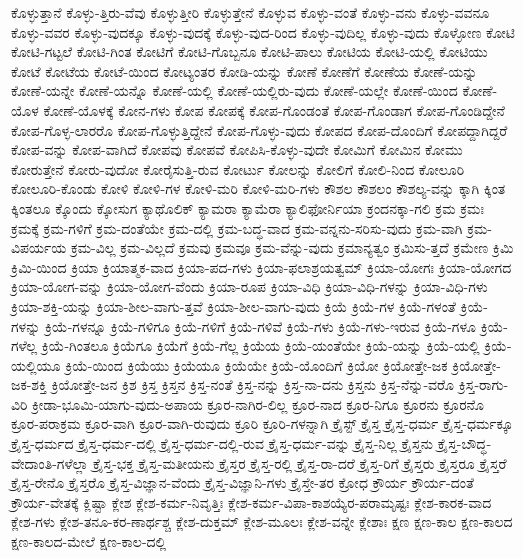{ಕೊಳ್ಳುತ್ತಾನೆ
ಕೊಳ್ಳು-ತ್ತಿರು-ವೆವು
ಕೊಳ್ಳುತ್ತೀರಿ
ಕೊಳ್ಳುತ್ತೇನೆ
ಕೊಳ್ಳುವ
ಕೊಳ್ಳು-ವಂತೆ
ಕೊಳ್ಳು-ವನು
ಕೊಳ್ಳು-ವವನೂ
ಕೊಳ್ಳು-ವವರ
ಕೊಳ್ಳು-ವುದಕ್ಕೂ
ಕೊಳ್ಳು-ವುದಕ್ಕೆ
ಕೊಳ್ಳು-ವುದ-ರಿಂದ
ಕೊಳ್ಳು-ವುದಿಲ್ಲ
ಕೊಳ್ಳು-ವುದು
ಕೊಳ್ಳೋಣ
ಕೋಟಿ
ಕೋಟಿ-ಗಟ್ಟಲೆ
ಕೋಟಿ-ಗಿಂತ
ಕೋಟಿಗೆ
ಕೋಟಿ-ಗೊಬ್ಬನೂ
ಕೋಟಿ-ಪಾಲು
ಕೋಟಿಯ
ಕೋಟಿ-ಯಲ್ಲಿ
ಕೋಟಿಯು
ಕೋಟೆ
ಕೋಟೆಯ
ಕೋಟೆ-ಯಿಂದ
ಕೋಟ್ಯಂತರ
ಕೋಡಿ-ಯನ್ನು
ಕೋಣೆ
ಕೋಣೆಗೆ
ಕೋಣೆಯ
ಕೋಣೆ-ಯನ್ನು
ಕೋಣೆ-ಯನ್ನೇ
ಕೋಣೆ-ಯನ್ನೊ
ಕೋಣೆ-ಯಲ್ಲಿ
ಕೋಣೆ-ಯಲ್ಲಿರು-ವುದು
ಕೋಣೆ-ಯಲ್ಲೇ
ಕೋಣೆ-ಯಿಂದ
ಕೋಣೆ-ಯೊಳ
ಕೋಣೆ-ಯೊಳಕ್ಕೆ
ಕೋನ-ಗಳು
ಕೋಪ
ಕೋಪಕ್ಕೆ
ಕೋಪ-ಗೊಂಡಂತೆ
ಕೋಪ-ಗೊಂಡಾಗ
ಕೋಪ-ಗೊಂಡಿದ್ದೇನೆ
ಕೋಪ-ಗೊಳ್ಳ-ಲಾರರೊ
ಕೋಪ-ಗೊಳ್ಳುತ್ತಿದ್ದೇನೆ
ಕೋಪ-ಗೊಳ್ಳು-ವುದು
ಕೋಪದ
ಕೋಪ-ದೊಂದಿಗೆ
ಕೋಪದ್ದಾಗಿದ್ದರೆ
ಕೋಪ-ವನ್ನು
ಕೋಪ-ವಾಗಿದೆ
ಕೋಪವು
ಕೋಪವೆ
ಕೋಪಿಸಿ-ಕೊಳ್ಳು-ವುದೇ
ಕೋಮಿಗೆ
ಕೋಮಿನ
ಕೋಮು
ಕೋರುತ್ತೇನೆ
ಕೋರು-ವುದೋ
ಕೋರೈಸುತ್ತಿ-ರುವ
ಕೋರ್ಟು
ಕೋಲನ್ನು
ಕೋಲಿಗೆ
ಕೋಲಿ-ನಿಂದ
ಕೋಲೂರಿ
ಕೋಲೂರಿ-ಕೊಂಡು
ಕೋಳಿ
ಕೋಳಿ-ಗಳ
ಕೋಳಿ-ಮರಿ
ಕೋಳಿ-ಮರಿ-ಗಳು
ಕೌಶಲ
ಕೌಶಲಂ
ಕೌಶಲ್ಯ-ವನ್ನು
ಕ್ಕಾಗಿ
ಕ್ಕಿಂತ
ಕ್ಕಿಂತಲೂ
ಕ್ಕೊಂದು
ಕ್ಕೋಸುಗ
ಕ್ಯಾಥೊಲಿಕ್
ಕ್ಯಾಮರಾ
ಕ್ಯಾಮೆರಾ
ಕ್ಯಾಲಿಫೋರ್ನಿಯಾ
ಕ್ರಂದನಕ್ಕಾ-ಗಲಿ
ಕ್ರಮ
ಕ್ರಮಃ
ಕ್ರಮಕ್ಕೆ
ಕ್ರಮ-ಗಳಿಗೆ
ಕ್ರಮ-ದಂತೆಯೇ
ಕ್ರಮ-ದಲ್ಲಿ
ಕ್ರಮ-ಬದ್ಧ-ವಾದ
ಕ್ರಮ-ವನ್ನನು-ಸರಿಸು-ವುದು
ಕ್ರಮ-ವಾಗಿ
ಕ್ರಮ-ವಿಪರ್ಯಯ
ಕ್ರಮ-ವಿಲ್ಲ
ಕ್ರಮ-ವಿಲ್ಲದೆ
ಕ್ರಮವು
ಕ್ರಮವೂ
ಕ್ರಮ-ವೆನ್ನು-ವುದು
ಕ್ರಮಾನ್ಯತ್ವಂ
ಕ್ರಮಿಸು-ತ್ತದೆ
ಕ್ರಮೇಣ
ಕ್ರಿಮಿ
ಕ್ರಿಮಿ-ಯಿಂದ
ಕ್ರಿಯಾ
ಕ್ರಿಯಾತ್ಮಕ-ವಾದ
ಕ್ರಿಯಾ-ಪದ-ಗಳು
ಕ್ರಿಯಾ-ಫಲಾಶ್ರಯತ್ವಮ್
ಕ್ರಿಯಾ-ಯೋಗಃ
ಕ್ರಿಯಾ-ಯೋಗದ
ಕ್ರಿಯಾ-ಯೋಗ-ವನ್ನು
ಕ್ರಿಯಾ-ಯೋಗ-ವೆಂದು
ಕ್ರಿಯಾ-ರೂಪ
ಕ್ರಿಯಾ-ವಿಧಿ
ಕ್ರಿಯಾ-ವಿಧಿ-ಗಳನ್ನು
ಕ್ರಿಯಾ-ವಿಧಿ-ಗಳು
ಕ್ರಿಯಾ-ಶಕ್ತಿ-ಯನ್ನು
ಕ್ರಿಯಾ-ಶೀಲ-ವಾಗು-ತ್ತವೆ
ಕ್ರಿಯಾ-ಶೀಲ-ವಾಗು-ವುದು
ಕ್ರಿಯೆ
ಕ್ರಿಯೆ-ಗಳ
ಕ್ರಿಯೆ-ಗಳಂತೆ
ಕ್ರಿಯೆ-ಗಳನ್ನು
ಕ್ರಿಯೆ-ಗಳನ್ನೂ
ಕ್ರಿಯೆ-ಗಳಿಗೂ
ಕ್ರಿಯೆ-ಗಳಿಗೆ
ಕ್ರಿಯೆ-ಗಳಿವೆ
ಕ್ರಿಯೆ-ಗಳು
ಕ್ರಿಯೆ-ಗಳು-ಇರುವ
ಕ್ರಿಯೆ-ಗಳೂ
ಕ್ರಿಯೆ-ಗಳೆಲ್ಲ
ಕ್ರಿಯೆ-ಗಿಂತಲೂ
ಕ್ರಿಯೆಗೂ
ಕ್ರಿಯೆಗೆ
ಕ್ರಿಯೆ-ಗೆಲ್ಲ
ಕ್ರಿಯೆಯ
ಕ್ರಿಯೆ-ಯಂತೆಯೇ
ಕ್ರಿಯೆ-ಯನ್ನು
ಕ್ರಿಯೆ-ಯಲ್ಲಿ
ಕ್ರಿಯೆ-ಯಲ್ಲಿಯೂ
ಕ್ರಿಯೆ-ಯಿಂದ
ಕ್ರಿಯೆಯು
ಕ್ರಿಯೆಯೂ
ಕ್ರಿಯೆಯೇ
ಕ್ರಿಯೆ-ಯೊಂದಿಗೆ
ಕ್ರಿಯೋ
ಕ್ರಿಯೋತ್ತೇ-ಜಕ
ಕ್ರಿಯೋತ್ತೇ-ಜಕ-ಶಕ್ತಿ
ಕ್ರಿಯೋತ್ತೇ-ಜನ
ಕ್ರಿಶ
ಕ್ರಿಸ್ತ
ಕ್ರಿಸ್ತನ
ಕ್ರಿಸ್ತ-ನಂತೆ
ಕ್ರಿಸ್ತ-ನನ್ನು
ಕ್ರಿಸ್ತ-ನಾ-ದನು
ಕ್ರಿಸ್ತನು
ಕ್ರಿಸ್ತ-ನೆನ್ನು-ವರೊ
ಕ್ರಿಸ್ತ-ರಾಗು-ವಿರಿ
ಕ್ರೀಡಾ-ಭೂಮಿ-ಯಾಗು-ವುದು-ಅಪಾಯ
ಕ್ರೂರ-ನಾಗಿರ-ಲಿಲ್ಲ
ಕ್ರೂರ-ನಾದ
ಕ್ರೂರ-ನಿಗೂ
ಕ್ರೂರನು
ಕ್ರೂರನೊ
ಕ್ರೂರ-ಪರಾಕ್ರಮ
ಕ್ರೂರ-ವಾಗಿ
ಕ್ರೂರ-ವಾಗಿ-ರುವುದು
ಕ್ರೂರಿ
ಕ್ರೂರಿ-ಗಳನ್ನಾಗಿ
ಕ್ರೈಸ್ಟ್
ಕ್ರೈಸ್ತ
ಕ್ರೈಸ್ತ-ಧರ್ಮ
ಕ್ರೈಸ್ತ-ಧರ್ಮಕ್ಕೂ
ಕ್ರೈಸ್ತ-ಧರ್ಮದ
ಕ್ರೈಸ್ತ-ಧರ್ಮ-ದಲ್ಲಿ
ಕ್ರೈಸ್ತ-ಧರ್ಮ-ದಲ್ಲಿ-ರುವ
ಕ್ರೈಸ್ತ-ಧರ್ಮ-ವನ್ನು
ಕ್ರೈಸ್ತ-ನಿಲ್ಲ
ಕ್ರೈಸ್ತನು
ಕ್ರೈಸ್ತ-ಬೌದ್ಧ-ವೇದಾಂತಿ-ಗಳೆಲ್ಲಾ
ಕ್ರೈಸ್ತ-ಭಕ್ತ
ಕ್ರೈಸ್ತ-ಮತೀಯನು
ಕ್ರೈಸ್ತರ
ಕ್ರೈಸ್ತ-ರಲ್ಲಿ
ಕ್ರೈಸ್ತ-ರಾ-ದರೆ
ಕ್ರೈಸ್ತ-ರಿಗೆ
ಕ್ರೈಸ್ತರು
ಕ್ರೈಸ್ತರೂ
ಕ್ರೈಸ್ತರೆ
ಕ್ರೈಸ್ತ-ರೇನೊ
ಕ್ರೈಸ್ತರೊ
ಕ್ರೈಸ್ತ-ವಿಜ್ಞಾನ-ವೆಂದು
ಕ್ರೈಸ್ತ-ವಿಜ್ಞಾನಿ-ಗಳು
ಕ್ರೈಸ್ತೇ-ತರ
ಕ್ರೋಧ
ಕ್ರೌರ್ಯ
ಕ್ರೌರ್ಯ-ದಂತೆ
ಕ್ರೌರ್ಯ-ವೇತಕ್ಕೆ
ಕ್ಲಿಷ್ಟಾ
ಕ್ಲೇಶ
ಕ್ಲೇಶ-ಕರ್ಮ-ನಿವೃತ್ತಿಃ
ಕ್ಲೇಶ-ಕರ್ಮ-ವಿಪಾ-ಕಾಶಯ್ಯೆರ-ಪರಾಮೃಷ್ಟಃ
ಕ್ಲೇಶ-ಕಾರಕ-ವಾದ
ಕ್ಲೇಶ-ಗಳು
ಕ್ಲೇಶ-ತನೂ-ಕರ-ಣಾರ್ಥಶ್ಚ
ಕ್ಲೇಶ-ದುಕ್ತಮ್
ಕ್ಲೇಶ-ಮೂಲಃ
ಕ್ಲೇಶ-ವನ್ನೇ
ಕ್ಲೇಶಾಃ
ಕ್ಷಣ
ಕ್ಷಣ-ಕಾಲ
ಕ್ಷಣ-ಕಾಲದ
ಕ್ಷಣ-ಕಾಲದ-ಮೇಲೆ
ಕ್ಷಣ-ಕಾಲ-ದಲ್ಲಿ
}

